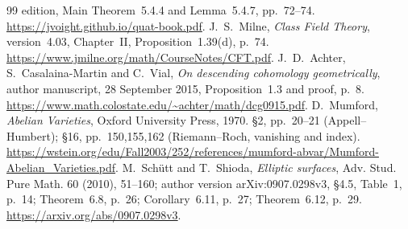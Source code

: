 \begin{thebibliography}{99}
edition, Main Theorem~5.4.4 and Lemma~5.4.7, pp.~72--74.
\url{https://jvoight.github.io/quat-book.pdf}.
 J.~S.~Milne, \emph{Class Field Theory},
version~4.03, Chapter~II, Proposition~1.39(d), p.~74.
\url{https://www.jmilne.org/math/CourseNotes/CFT.pdf}.
 J.~D.~Achter, S.~Casalaina-Martin and C.~Vial,
\emph{On descending cohomology geometrically}, author manuscript,
28 September 2015, Proposition~1.3 and proof, p.~8.
\url{https://www.math.colostate.edu/~achter/math/dcg0915.pdf}.
 D.~Mumford, \emph{Abelian Varieties},
Oxford University Press, 1970. \S2, pp.~20--21 (Appell--Humbert);
\S16, pp.~150,155,162 (Riemann--Roch, vanishing and index).
\url{https://wstein.org/edu/Fall2003/252/references/mumford-abvar/Mumford-Abelian_Varieties.pdf}.
 M.~Sch\"utt and T.~Shioda,
\emph{Elliptic surfaces}, Adv. Stud. Pure Math. 60 (2010), 51--160;
author version arXiv:0907.0298v3, \S4.5, Table~1, p.~14;
Theorem~6.8, p.~26; Corollary~6.11, p.~27; Theorem~6.12, p.~29.
\url{https://arxiv.org/abs/0907.0298v3}.
\end{thebibliography}

